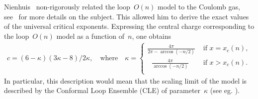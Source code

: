 \documentclass[reqno,11pt,a4paper]{amsart}
\theoremstyle{remark}
\begin{document}
Nienhuis~\cite{Nie84} non-rigorously related the loop~$O(n)$ model to the Coulomb gas, see~\cite{Mus10} for more details on the subject.
This allowed him to derive the exact values of the universal critical exponents.
Expressing the central charge corresponding to the loop~$O(n)$ model as a function of~$n$, one obtains
\begin{align}
\label{eq:intro-central-charge}
	c = (6-\kappa)(3\kappa - 8) /2\kappa,
	\quad
	\text{where}
	\quad
	\kappa = 
	\begin{cases}
		\tfrac{4\pi}{2\pi-\arccos(-n/2)} &\text{ if } x=x_c(n),\\
		\,\,\,\,\tfrac{4\pi}{\arccos(-n/2)} &\text{ if } x>x_c(n).\\
	\end{cases}	
\end{align}
In particular, this description would mean that the scaling limit of the model is described by the Conformal Loop Ensemble (CLE) of parameter~$\kappa$ (see eg. \cite[Section~5.6]{KagNie04}).
\end{document}
